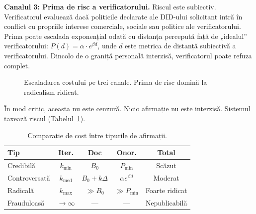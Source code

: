\documentclass[11pt,a4paper,twocolumn]{article}
\begin{document}
\textbf{Canalul 3: Prima de risc a verificatorului.} Riscul este subiectiv. Verificatorul evaluează dacă politicile declarate ale DID-ului solicitant intră în conflict cu propriile interese comerciale, sociale sau politice ale verificatorului. Prima poate escalada exponențial odată cu distanța percepută față de „idealul” verificatorului: $P(d) = \alpha \cdot e^{\beta d}$, unde $d$ este metrica de distanță subiectivă a verificatorului. Dincolo de o graniță personală interzisă, verificatorul poate refuza complet.

\begin{figure}[ht]
\centering
{}
\caption{Escaladarea costului pe trei canale. Prima de risc domină la radicalism ridicat.}
\label{fig:radicalism}
\end{figure}

În mod critic, aceasta nu este cenzură. Nicio afirmație nu este interzisă. Sistemul taxează riscul (Tabelul~\ref{tab:costs}).

\begin{table}[ht]
\centering
\caption{Comparație de cost între tipurile de afirmații.}
\label{tab:costs}
\footnotesize
\begin{tabular}{@{}lcccc@{}}
\toprule
\textbf{Tip} & \textbf{Iter.} & \textbf{Doc} & \textbf{Onor.} & \textbf{Total} \\
\midrule
Credibilă & $k_{\min}$ & $B_0$ & $P_{\min}$ & Scăzut \\
Controversată & $k_{\text{med}}$ & $B_0{+}k\Delta$ & $\alpha e^{\beta d}$ & Moderat \\
Radicală & $k_{\max}$ & $\gg B_0$ & $\gg P_{\min}$ & Foarte ridicat \\
Frauduloasă & $\to\infty$ & --- & --- & Nepublicabilă \\
\bottomrule
\end{tabular}
\end{table}
\end{document}
